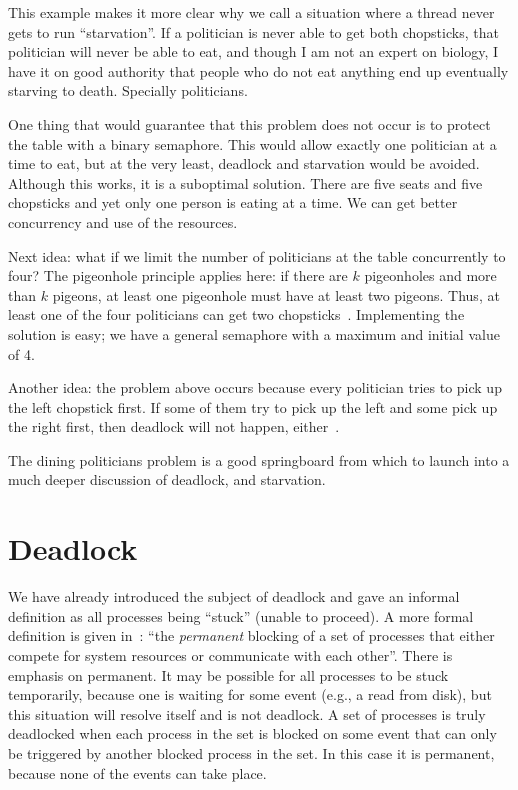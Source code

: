 This example makes it more clear why we call a situation where a thread never gets to run ``starvation''. If a politician is never able to get both chopsticks, that politician will never be able to eat, and though I am not an expert on biology, I have it on good authority that people who do not eat anything end up eventually starving to death. Specially politicians.

One thing that would guarantee that this problem does not occur is to protect the table with a binary semaphore. This would allow exactly one politician at a time to eat, but at the very least, deadlock and starvation would be avoided. Although this works, it is a suboptimal solution. There are five seats and five chopsticks and yet only one person is eating at a time. We can get better concurrency and use of the resources.

Next idea: what if we limit the number of politicians at the table concurrently to four? The pigeonhole principle applies here: if there are $k$ pigeonholes and more than $k$ pigeons, at least one pigeonhole must have at least two pigeons. Thus, at least one of the four politicians can get two chopsticks~\cite{mte241}. Implementing the solution is easy; we have a general semaphore with a maximum and initial value of 4.

Another idea: the problem above occurs because every politician tries to pick up the left chopstick first. If some of them try to pick up the left and some pick up the right first, then deadlock will not happen, either~\cite{osc}.

The dining politicians problem is a good springboard from which to launch into a much deeper discussion of deadlock, and starvation.


\section*{Deadlock}
We have already introduced the subject of deadlock and gave an informal definition as all processes being ``stuck'' (unable to proceed). A more formal definition is given in~\cite{osi}: ``the \textit{permanent} blocking of a set of processes that either compete for system resources or communicate with each other''. There is emphasis on permanent. It may be possible for all processes to be stuck temporarily, because one is waiting for some event (e.g., a read from disk), but this situation will resolve itself and is not deadlock. A set of processes is truly deadlocked when each process in the set is blocked on some event that can only be triggered by another blocked process in the set. In this case it is permanent, because none of the events can take place.

